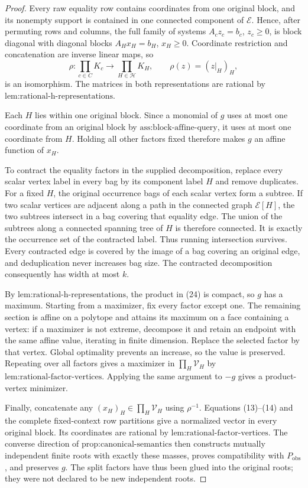 \documentclass{article}
\begin{document}
\begin{proof}
Every raw equality row contains coordinates from one original block, and its nonempty support is contained in one connected component of \(\mathcal E\).  Hence, after permuting rows and columns, the full family of systems \(A_cz_c=b_c\), \(z_c\ge0\), is block diagonal with diagonal blocks \(A_Hx_H=b_H\), \(x_H\ge0\).  Coordinate restriction and concatenation are inverse linear maps, so
\[
\rho:\prod_{c\in C}K_c\longrightarrow\prod_{H\in\mathcal H}K_H,
\qquad \rho(z)=(z|_H)_H, \tag{24}
\]
is an isomorphism.  The matrices in both representations are rational by \(\text{lem:rational-h-representations}\).

Each \(H\) lies within one original block.  Since a monomial of \(g\) uses at most one coordinate from an original block by \(\text{ass:block-affine-query}\), it uses at most one coordinate from \(H\).  Holding all other factors fixed therefore makes \(g\) an affine function of \(x_H\).

To contract the equality factors in the supplied decomposition, replace every scalar vertex label in every bag by its component label \(H\) and remove duplicates.  For a fixed \(H\), the original occurrence bags of each scalar vertex form a subtree.  If two scalar vertices are adjacent along a path in the connected graph \(\mathcal E[H]\), the two subtrees intersect in a bag covering that equality edge.  The union of the subtrees along a connected spanning tree of \(H\) is therefore connected.  It is exactly the occurrence set of the contracted label.  Thus running intersection survives.  Every contracted edge is covered by the image of a bag covering an original edge, and deduplication never increases bag size.  The contracted decomposition consequently has width at most \(k\).

By \(\text{lem:rational-h-representations}\), the product in (24) is compact, so \(g\) has a maximum.  Starting from a maximizer, fix every factor except one.  The remaining section is affine on a polytope and attains its maximum on a face containing a vertex: if a maximizer is not extreme, decompose it and retain an endpoint with the same affine value, iterating in finite dimension.  Replace the selected factor by that vertex.  Global optimality prevents an increase, so the value is preserved.  Repeating over all factors gives a maximizer in \(\prod_H\mathcal V_H\) by \(\text{lem:rational-factor-vertices}\).  Applying the same argument to \(-g\) gives a product-vertex minimizer.

Finally, concatenate any \((x_H)_H\in\prod_H\mathcal V_H\) using \(\rho^{-1}\).  Equations (13)--(14) and the complete fixed-context row partitions give a normalized vector in every original block.  Its coordinates are rational by \(\text{lem:rational-factor-vertices}\).  The converse direction of \(\text{prop:canonical-semantics}\) then constructs mutually independent finite roots with exactly these masses, proves compatibility with \(P_{\mathrm{obs}}\), and preserves \(g\).  The split factors have thus been glued into the original roots; they were not declared to be new independent roots.
\end{proof}
\end{document}

